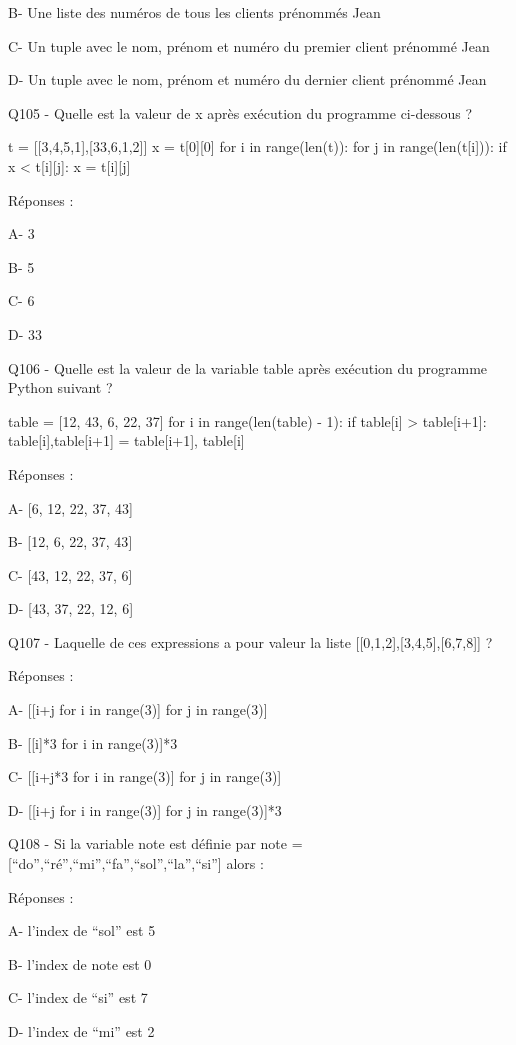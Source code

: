 \documentclass[
]{book}
\begin{document}
B- Une liste des numéros de tous les clients prénommés Jean

C- Un tuple avec le nom, prénom et numéro du premier client prénommé Jean

D- Un tuple avec le nom, prénom et numéro du dernier client prénommé Jean

Q105 - Quelle est la valeur de x après exécution du programme ci-dessous ?

t = {[}{[}3,4,5,1{]},{[}33,6,1,2{]}{]}
x = t{[}0{]}{[}0{]}
for i in range(len(t)):
for j in range(len(t{[}i{]})):
if x \textless{} t{[}i{]}{[}j{]}:
x = t{[}i{]}{[}j{]}

Réponses :

A- 3

B- 5

C- 6

D- 33

Q106 - Quelle est la valeur de la variable table après exécution du programme Python suivant ?

table = {[}12, 43, 6, 22, 37{]}
for i in range(len(table) - 1):
if table{[}i{]} \textgreater{} table{[}i+1{]}:
table{[}i{]},table{[}i+1{]} = table{[}i+1{]}, table{[}i{]}

Réponses :

A- {[}6, 12, 22, 37, 43{]}

B- {[}12, 6, 22, 37, 43{]}

C- {[}43, 12, 22, 37, 6{]}

D- {[}43, 37, 22, 12, 6{]}

Q107 - Laquelle de ces expressions a pour valeur la liste {[}{[}0,1,2{]},{[}3,4,5{]},{[}6,7,8{]}{]} ?

Réponses :

A- {[}{[}i+j for i in range(3){]} for j in range(3){]}

B- {[}{[}i{]}*3 for i in range(3){]}*3

C- {[}{[}i+j*3 for i in range(3){]} for j in range(3){]}

D- {[}{[}i+j for i in range(3){]} for j in range(3){]}*3

Q108 - Si la variable note est définie par note = {[}``do'',``ré'',``mi'',``fa'',``sol'',``la'',``si''{]} alors :

Réponses :

A- l'index de ``sol'' est 5

B- l'index de note est 0

C- l'index de ``si'' est 7

D- l'index de ``mi'' est 2
\end{document}
